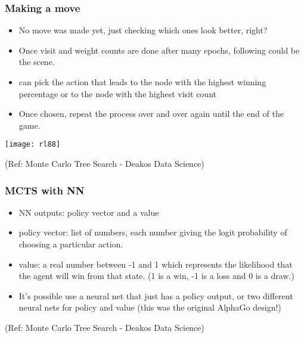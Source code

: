 \begin{frame}[fragile]\frametitle{Making a move}

\begin{itemize}
\item No move was made yet, just checking which ones look better, right?
\item Once visit and weight counts are done after many epochs, following could be the scene.
\item can pick the action that leads to the node with the highest winning percentage or to the node with the highest visit count
\item Once chosen, repeat the process over and over again until the end of the game.
\end{itemize}

\begin{center}
\texttt{[image: rl88]}
\end{center}


{\tiny (Ref: Monte Carlo Tree Search - Deakos Data Science)}

\end{frame}


\begin{frame}[fragile]\frametitle{MCTS with NN}

\begin{itemize}
\item NN outputs: policy vector and a value
\item policy vector: list of numbers, each number giving the logit probability of choosing a particular action. 
\item value: a real number between -1 and 1 which represents the likelihood that the agent will win from that state. (1 is a win, -1 is a loss and 0 is a draw.)
\item It's possible use a neural net that just has a policy output, or two different neural nets for policy and value (this was the original AlphaGo design!)
\end{itemize}




{\tiny (Ref: Monte Carlo Tree Search - Deakos Data Science)}

\end{frame}


